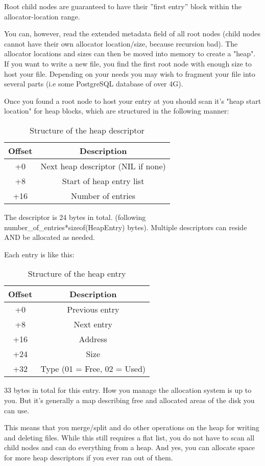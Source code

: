 \documentclass[12pt]{article}
\begin{document}
Root child nodes are guaranteed to have their ''first entry'' block within the allocator-location range.

You can, however, read the extended metadata field of all root nodes (child nodes cannot have their own allocator location/size, because recursion bad). The allocator locations and sizes can then be moved into memory to create a "heap". If you want to write a new file, you find the first root node with enough size to host your file. Depending on your needs you may wish to fragment your file into several parts (i.e some PostgreSQL database of over 4G).

Once you found a root node to host your entry at you should scan it's "heap start location" for heap blocks, which are structured in the following manner:
\begin{table}
\centering
\begin{tabular}{ |c|c| }
\hline
Offset & Description \\
\hline
+0 & Next heap descriptor (NIL if none) \\
+8 & Start of heap entry list \\
+16 & Number of entries \\
\hline
\end{tabular}
\caption{Structure of the heap descriptor}
\end{table}

The descriptor is 24 bytes in total. (following number\_of\_entries*sizeof(HeapEntry) bytes). Multiple descriptors can reside AND be allocated as needed.

Each entry is like this:
\begin{table}
\centering
\begin{tabular}{ |c|c| }
\hline
Offset & Description \\
\hline
+0 & Previous entry \\
+8 & Next entry \\
+16 & Address \\
+24 & Size \\
+32 & Type (01 = Free, 02 = Used) \\
\hline
\end{tabular}
\caption{Structure of the heap entry}
\end{table}

33 bytes in total for this entry. How you manage the allocation system is up to you. But it's generally a map describing free and allocated areas of the disk you can use.

This means that you merge/split and do other operations on the heap for writing and deleting files. While this still requires a flat list, you do not have to scan all child nodes and can do everything from a heap. And yes, you can allocate space for more heap descriptors if you ever ran out of them.
\end{document}
